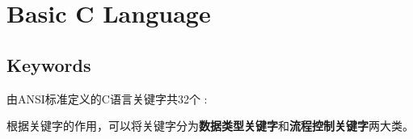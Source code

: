 \chapter{Basic C Language}\label{sec:basic_chapter}

\section{Keywords}
由ANSI标准定义的C语言关键字共32个 :




根据关键字的作用，可以将关键字分为\textbf{数据类型关键字}和\textbf{流程控制关键字}两大类。

